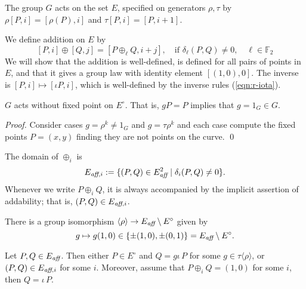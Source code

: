 \documentclass{llncs}
\newcommand{\ring}[1]{\mathbb{#1}}
\newcommand{\op}[1]{\hbox{#1}}
\newcommand{\Eaff}{E_{\op{\scriptsize\it aff}}}
\newcommand{\Eaf}[1]{E_{\op{\scriptsize\it aff},{#1}}}
\newcommand{\Eoo}{E^{\circ}} %
\newcommand{\ang}[1]{\langle{#1}\rangle}
\begin{document}
The group $G$ acts on the set $E$, specified on generators $\rho,\tau$
by $\rho[P,i]=[\rho(P),i]$ and $\tau[P,i]=[P,i+1]$.

We define addition on $E$ by
\begin{equation}\label{eqn:add-proj}
[P,i]\oplus [Q,j] = [P\oplus_\ell Q,i+j],\quad 
\text{if } \delta_\ell(P,Q)\ne 0,\quad \ell\in\ring{F}_2
\end{equation}
We will show that the addition is well-defined, is defined for all
pairs of points in $E$, and that it gives a group law with identity
element $[(1,0),0]$.  The inverse is $[P,i]\mapsto [\iota P,i]$, which
is well-defined by the inverse rules (\ref{eqn:r-iota}).


\begin{lemma} \label{lemma:no-fix} $G$ acts without fixed point on
  $\Eoo$.  That is, $g P = P$ implies that $g=1_G\in G$.
\end{lemma}

\begin{proof} Consider cases $g = \rho^k\ne 1_G$
and $g=\tau\rho^k$ and each case compute the fixed points $P=(x,y)$ finding they
are not points on the curve. 
\qed\end{proof}

The domain of $\oplus_i$ is
\[
\Eaf{i} := \{(P,Q)\in \Eaff^2\mid \delta_i(P,Q)\ne0\}.
\]
Whenever we write $P\oplus_i Q$, it is always accompanied by the
implicit assertion of addability; that is, $(P,Q)\in \Eaf{i}$.

There is a group isomorphism $\ang{\rho}\to \Eaff\setminus\Eoo$ given by
\[
g\mapsto g(1,0)\in\{\pm (1,0),\pm (0,1)\} = \Eaff\setminus \Eoo.
\]

\begin{lemma}[dichotomy]\label{lemma:noco} 
\par
\noindent  
Let $P,Q\in \Eaff$.  Then either $P\in \Eoo$ and $Q=g \iota\, P$ for
some $g\in \tau\ang{\rho}$, or $(P,Q)\in \Eaf{i}$ for some $i$.
Moreover, assume that $P\oplus_i Q = (1,0)$ for some $i$, then $Q =
\iota\,P$.
\end{lemma}
\end{document}
